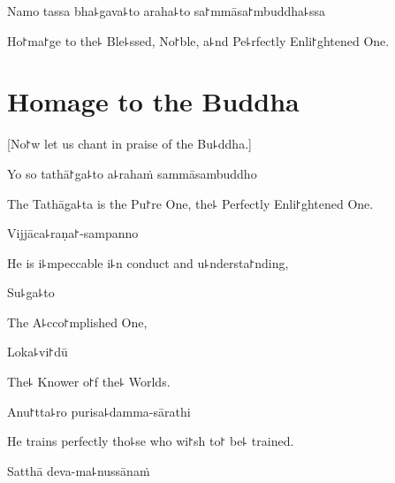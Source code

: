 \vspace{\baselineskip}

Namo tassa bha꜕gava꜕to araha꜕to sa꜓mmāsa꜓mbuddha꜕ssa


\begin{english}
  Ho꜓ma꜓ge to the꜕ Ble꜕ssed, No꜓ble, a꜕nd Pe꜕rfectly Enli꜓ghtened One.

\end{english}

\clearpage

\chapter{Homage to the Buddha}

\begin{leader}
\end{leader}

\begin{english}
  [No꜓w let us chant in praise of the Bu꜕ddha.]
\end{english}

Yo so tathā꜓ga꜕to a꜕rahaṁ sammāsambuddho

\begin{english}
  The Tathāga꜕ta is the Pu꜓re One, the꜕ Perfectly Enli꜓ghtened One.
\end{english}

Vijjāca꜕raṇa꜓-sampanno

\begin{english}
  He is i꜕mpeccable i꜕n conduct and u꜕ndersta꜓nding,
\end{english}

Su꜕ga꜕to

\begin{english}
  The A꜕cco꜓mplished One,
\end{english}

Loka꜕vi꜓dū

\begin{english}
  The꜕ Knower o꜓f the꜕ Worlds.
\end{english}

Anu꜓tta꜕ro purisa꜕damma-sārathi

\begin{english}
  He trains perfectly tho꜕se who wi꜓sh to꜓ be꜕ trained.
\end{english}

Satthā deva-ma꜕nussānaṁ

